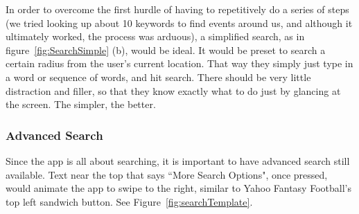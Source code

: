 \documentclass[11pt]{article}
\begin{document}
In order to overcome the first hurdle of having to repetitively do a series of steps (we tried looking up about 10 keywords to find events around us, and although it ultimately worked, the process was arduous), a simplified search, as in figure~\ref{fig:SearchSimple} (b), would be ideal. It would be preset to search a certain radius from the user's current location. That way they simply just type in a word or sequence of words, and hit search. There should be very little distraction and filler, so that they know exactly what to do just by glancing at the screen. The simpler, the better.

\subsubsection{Advanced Search}
Since the app is all about searching, it is important to have advanced search still available. Text near the top that says ``More Search Options", once pressed, would animate the app to swipe to the right, similar to Yahoo Fantasy Football's top left sandwich button. See Figure~\ref{fig:searchTemplate}.
\end{document}
